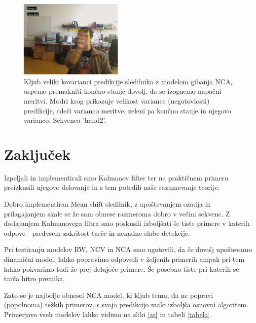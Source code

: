 \documentclass[a4paper]{article}
\begin{document}
\begin{figure}[h]
	\begin{center}
		\includegraphics [width=0.45\textwidth] {ncahand.pdf}
	\end{center}
	\caption{Kljub veliki kovarianci predikcije sledilnika z modelom gibanja NCA, uspemo premakniti končno stanje dovolj, da se izognemo napačni meritvi. Modri krog prikazuje velikost variance (negotoviosti) predikcije, rdeči varianco meritve, zeleni pa končno stanje in njegovo varianco. Sekvenca 'hand2'.}
	\label{ncahand}
\end{figure}


\section{Zaključek}
Izpeljali in implementirali smo Kalmanov filter ter na praktičnem primeru preizkusili njegovo delovanje in s tem potrdili naše razumevanje teorije. 

Dobro implementiran Mean shift sledilnik, z upoštevanjem ozadja in prilagajanjem skale se že sam obnese razmeroma dobro v večini sekvenc. Z dodajanjem Kalmanovega filtra smo poskusili izboljšati še tiste primere v katerih odpove - predvsem zakritost tarče in nenadne slabe detekcije. 

Pri testiranju modelov RW, NCV in NCA smo ugotovili, da če dovolj upoštevamo dinamični model, lahko  popravimo odpovedi v željenih primerih ampak pri tem lahko pokvarimo tudi že prej delujoče primere. Še posebno tiste pri katerih se tarča hitro premika. 

Zato se je najbolje obnesel NCA model, ki kljub temu, da ne popravi (popolnoma) težkih primerov, s svojo predikcijo malo izboljša osnovni algoritem. Primerjavo vseh modelov lahko vidimo na sliki \ref{ar} in tabeli \ref{tabela}. 
\end{document}
